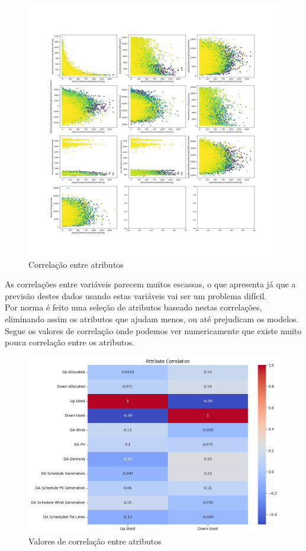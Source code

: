 \begin{figure}[H]
  \centering
  \includegraphics[width=\textwidth]{plots/feature_correlation.png}
  \caption{Correlação entre atributos}
  \label{fig:featurecorrelation}
\end{figure}

As correlações entre variáveis parecem muitos escassas, o que apresenta já que a previsão destes dados usando estas variáveis vai ser um problema difícil.\\
Por norma é feito uma seleção de atributos baseado nestas correlações, eliminando assim os atributos que ajudam menos, ou até prejudicam os modelos.\\
Segue os valores de correlação onde podemos ver numericamente que existe muito pouca correlação entre os atributos.\\

\begin{figure}[H]
  \centering
  \includegraphics[width=\textwidth]{plots/correlation_heatmap.png}
  \caption{Valores de correlação entre atributos}
  \label{fig:correlationheatmap}
\end{figure}

